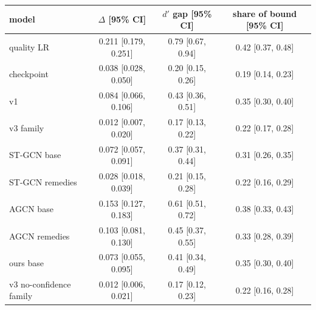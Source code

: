 \begin{tabular}{lccc}
\toprule
model & $\Delta$ [95\% CI] & $d'$ gap [95\% CI] & share of bound [95\% CI] \\
\midrule
quality LR & 0.211 [0.179, 0.251] & 0.79 [0.67, 0.94] & 0.42 [0.37, 0.48] \\
checkpoint & 0.038 [0.028, 0.050] & 0.20 [0.15, 0.26] & 0.19 [0.14, 0.23] \\
v1 & 0.084 [0.066, 0.106] & 0.43 [0.36, 0.51] & 0.35 [0.30, 0.40] \\
v3 family & 0.012 [0.007, 0.020] & 0.17 [0.13, 0.22] & 0.22 [0.17, 0.28] \\
ST-GCN base & 0.072 [0.057, 0.091] & 0.37 [0.31, 0.44] & 0.31 [0.26, 0.35] \\
ST-GCN remedies & 0.028 [0.018, 0.039] & 0.21 [0.15, 0.28] & 0.22 [0.16, 0.29] \\
AGCN base & 0.153 [0.127, 0.183] & 0.61 [0.51, 0.72] & 0.38 [0.33, 0.43] \\
AGCN remedies & 0.103 [0.081, 0.130] & 0.45 [0.37, 0.55] & 0.33 [0.28, 0.39] \\
ours base & 0.073 [0.055, 0.095] & 0.41 [0.34, 0.49] & 0.35 [0.30, 0.40] \\
v3 no-confidence family & 0.012 [0.006, 0.021] & 0.17 [0.12, 0.23] & 0.22 [0.16, 0.28] \\
\bottomrule
\end{tabular}
